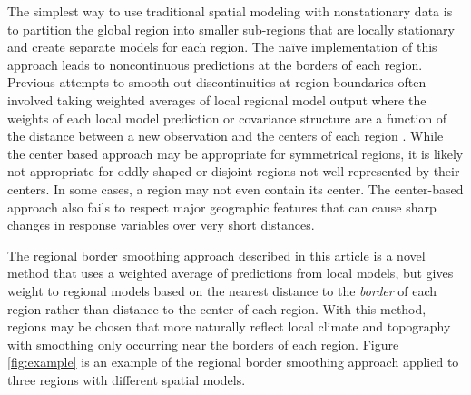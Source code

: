 The simplest way to use traditional spatial modeling with nonstationary data is to partition the global region into smaller sub-regions that are locally stationary and create separate models for each region. The na\"ive implementation of this approach leads to noncontinuous predictions at the borders of each region. Previous attempts to smooth out discontinuities at region boundaries often involved taking weighted averages of local regional model output where the weights of each local model prediction or covariance structure are a function of the distance between a new observation and the centers of each region \citep{fuentes_high_2001, fuentes_new_2001, gosoniu_bayesian_2006, gosoniu_mapping_2009, konomi_adaptive_2014}. While the center based approach may be appropriate for symmetrical regions, it is likely not appropriate for oddly shaped or disjoint regions not well represented by their centers. In some cases, a region may not even contain its center. The center-based approach also fails to respect major geographic features that can cause sharp changes in response variables over very short distances. 

The regional border smoothing approach described in this article is a novel method that uses a weighted average of predictions from local models, but gives weight to regional models based on the nearest distance to the \emph{border} of each region rather than distance to the center of each region. With this method, regions may be chosen that more naturally reflect local climate and topography with smoothing only occurring near the borders of each region. Figure \ref{fig:example} is an example of the regional border smoothing approach applied to three regions with different spatial models.


